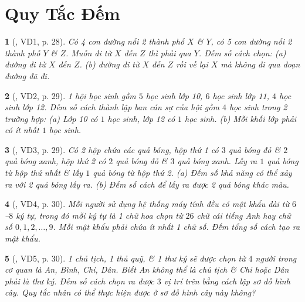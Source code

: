 \documentclass{article}
\newtheorem{baitoan}{}
\begin{document}
\section{Quy Tắc Đếm}

\begin{baitoan}[\cite{Hai_Hung_Thu_Tung_ncpt_Toan_10_tap_2}, VD1, p. 28]
	Có 4 con đường nối 2 thành phố $X$ \& $Y$, có 5 con đường nối 2 thành phố $Y$ \& $Z$. Muốn đi từ $X$ đến $Z$ thì phải qua $Y$. Đếm số cách chọn: (a) đường đi từ $X$ đến $Z$. (b) đường đi từ $X$ đến $Z$ rồi về lại $X$ mà không đi qua đoạn đường đã đi.
\end{baitoan}

\begin{baitoan}[\cite{Hai_Hung_Thu_Tung_ncpt_Toan_10_tap_2}, VD2, p. 29]
	1 hội học sinh gồm $5$ học sinh lớp 10, $6$ học sinh lớp 11, $4$ học sinh lớp 12. Đếm số cách thành lập ban cán sự của hội gồm $4$ học sinh trong 2 trường hợp: (a) Lớp 10 có $1$ học sinh, lớp 12 có $1$ học sinh. (b) Mỗi khối lớp phải có ít nhất $1$ học sinh.
\end{baitoan}

\begin{baitoan}[\cite{Hai_Hung_Thu_Tung_ncpt_Toan_10_tap_2}, VD3, p. 29]
	Có 2 hộp chứa các quả bóng, hộp thứ 1 có $3$ quả bóng đỏ \& $2$ quả bóng xanh, hộp thứ 2 có $2$ quả bóng đỏ \& $3$ quả bóng xanh. Lấy ra $1$ quả bóng từ hộp thứ nhất \& lấy $1$ quả bóng từ hộp thứ 2. (a) Đếm số khả năng có thể xảy ra với 2 quả bóng lấy ra. (b) Đếm số cách để lấy ra được 2 quả bóng khác màu.
\end{baitoan}

\begin{baitoan}[\cite{Hai_Hung_Thu_Tung_ncpt_Toan_10_tap_2}, VD4, p. 30]
	Mỗi người sử dụng hệ thống máy tính đều có mật khẩu dài từ $6$--$8$ ký tự, trong đó mỗi ký tự là 1 chữ hoa chọn từ $26$ chữ cái tiếng Anh hay chữ số $0,1,2,\ldots,9$. Mỗi mật khẩu phải chứa ít nhất 1 chữ số. Đếm tổng số cách tạo ra mật khẩu.
\end{baitoan}

\begin{baitoan}[\cite{Hai_Hung_Thu_Tung_ncpt_Toan_10_tap_2}, VD5, p. 30]
	1 chủ tịch, 1 thủ quỹ, \& 1 thư ký sẽ được chọn từ $4$ người trong cơ quan là An, Bình, Chi, Dân. Biết An không thể là chủ tịch \& Chi hoặc Dân phải là thư ký. Đếm số cách chọn ra được $3$ vị trí trên bằng cách lập sơ đồ hình cây. Quy tắc nhân có thể thực hiện được ở sơ đồ hình cây này không?
\end{baitoan}
\end{document}
